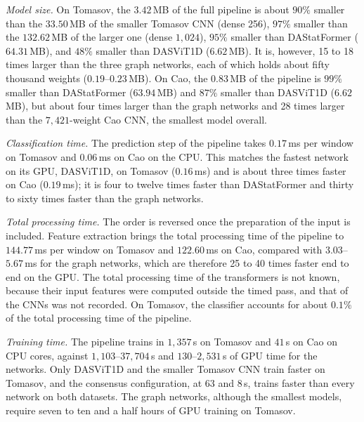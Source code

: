 \emph{Model size.} On Tomasov, the $3.42$\,MB of the full pipeline is about $90\%$ smaller than the $33.50$\,MB of the smaller Tomasov CNN (dense 256), $97\%$ smaller than the $132.62$\,MB of the larger one (dense $1{,}024$), $95\%$ smaller than DAStatFormer ($64.31$\,MB), and $48\%$ smaller than DASViT1D ($6.62$\,MB). It is, however, 15 to 18 times larger than the three graph networks, each of which holds about fifty thousand weights ($0.19$--$0.23$\,MB). On Cao, the $0.83$\,MB of the pipeline is $99\%$ smaller than DAStatFormer ($63.94$\,MB) and $87\%$ smaller than DASViT1D ($6.62$\,MB), but about four times larger than the graph networks and 28 times larger than the $7{,}421$-weight Cao CNN, the smallest model overall.

\emph{Classification time.} The prediction step of the pipeline takes $0.17$\,ms per window on Tomasov and $0.06$\,ms on Cao on the CPU. This matches the fastest network on its GPU, DASViT1D, on Tomasov ($0.16$\,ms) and is about three times faster on Cao ($0.19$\,ms); it is four to twelve times faster than DAStatFormer and thirty to sixty times faster than the graph networks.

\emph{Total processing time.} The order is reversed once the preparation of the input is included. Feature extraction brings the total processing time of the pipeline to $144.77$\,ms per window on Tomasov and $122.60$\,ms on Cao, compared with $3.03$--$5.67$\,ms for the graph networks, which are therefore 25 to 40 times faster end to end on the GPU. The total processing time of the transformers is not known, because their input features were computed outside the timed pass, and that of the CNNs was not recorded. On Tomasov, the classifier accounts for about $0.1\%$ of the total processing time of the pipeline.

\emph{Training time.} The pipeline trains in $1{,}357$\,s on Tomasov and $41$\,s on Cao on CPU cores, against $1{,}103$--$37{,}704$\,s and $130$--$2{,}531$\,s of GPU time for the networks. Only DASViT1D and the smaller Tomasov CNN train faster on Tomasov, and the consensus configuration, at $63$ and $8$\,s, trains faster than every network on both datasets. The graph networks, although the smallest models, require seven to ten and a half hours of GPU training on Tomasov.

